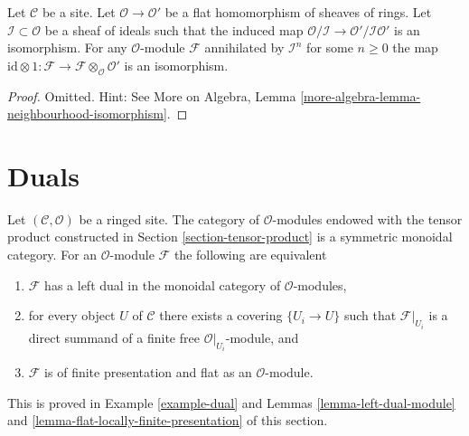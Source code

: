 \begin{lemma}
\label{lemma-neighbourhood-isomorphism}
Let $\mathcal{C}$ be a site. Let $\mathcal{O} \to \mathcal{O}'$
be a flat homomorphism of sheaves of rings. Let
$\mathcal{I} \subset \mathcal{O}$
be a sheaf of ideals such that the induced map
$\mathcal{O}/\mathcal{I} \to \mathcal{O}'/\mathcal{I}\mathcal{O}'$
is an isomorphism. For any $\mathcal{O}$-module $\mathcal{F}$
annihilated by $\mathcal{I}^n$ for some $n \geq 0$ the map
$\text{id} \otimes 1 :
\mathcal{F} \to \mathcal{F} \otimes_\mathcal{O} \mathcal{O}'$
is an isomorphism.
\end{lemma}

\begin{proof}
Omitted. Hint: See More on Algebra, Lemma
\ref{more-algebra-lemma-neighbourhood-isomorphism}.
\end{proof}





\section{Duals}
\label{section-duals}

\noindent
Let $(\mathcal{C}, \mathcal{O})$ be a ringed site. The category of
$\mathcal{O}$-modules endowed with the tensor product
constructed in Section \ref{section-tensor-product}
is a symmetric monoidal category. For an $\mathcal{O}$-module
$\mathcal{F}$ the following are equivalent
\begin{enumerate}
\item $\mathcal{F}$ has a left dual in the monoidal category
of $\mathcal{O}$-modules,
\item for every object $U$ of $\mathcal{C}$ there exists a covering
$\{U_i \to U\}$ such that $\mathcal{F}|_{U_i}$ is a direct summand
of a finite free $\mathcal{O}|_{U_i}$-module, and
\item $\mathcal{F}$ is of finite presentation and flat as an
$\mathcal{O}$-module.
\end{enumerate}
This is proved in Example \ref{example-dual} and
Lemmas \ref{lemma-left-dual-module} and
\ref{lemma-flat-locally-finite-presentation} of this section.

